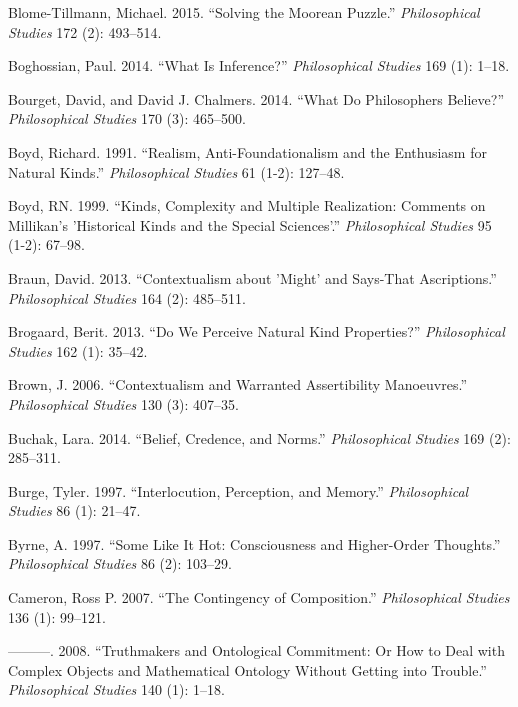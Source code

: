 \documentclass[
  10pt,
  letterpaper,
  DIV=11,
  numbers=noendperiod,
  twoside]{scrartcl}
\newlength{\cslhangindent}
\newenvironment{CSLReferences}[2] %
 {\begin{list}{}{%
  \setlength{\itemindent}{0pt}
  \setlength{\leftmargin}{0pt}
  \setlength{\parsep}{0pt}
  \ifodd #1
   \setlength{\leftmargin}{\cslhangindent}
   \setlength{\itemindent}{-1\cslhangindent}
  \fi
  \setlength{\itemsep}{#2\baselineskip}}}
 {\end{list}}
\begin{document}
\begin{CSLReferences}{1}{0}
Blome-Tillmann, Michael. 2015. {``Solving the Moorean Puzzle.''}
\emph{Philosophical Studies} 172 (2): 493--514.

Boghossian, Paul. 2014. {``What Is Inference?''} \emph{Philosophical
Studies} 169 (1): 1--18.

Bourget, David, and David J. Chalmers. 2014. {``What Do Philosophers
Believe?''} \emph{Philosophical Studies} 170 (3): 465--500.

Boyd, Richard. 1991. {``Realism, Anti-Foundationalism and the Enthusiasm
for Natural Kinds.''} \emph{Philosophical Studies} 61 (1-2): 127--48.

Boyd, RN. 1999. {``Kinds, Complexity and Multiple Realization: Comments
on Millikan's 'Historical Kinds and the Special Sciences'.''}
\emph{Philosophical Studies} 95 (1-2): 67--98.

Braun, David. 2013. {``Contextualism about 'Might' and Says-That
Ascriptions.''} \emph{Philosophical Studies} 164 (2): 485--511.

Brogaard, Berit. 2013. {``Do We Perceive Natural Kind Properties?''}
\emph{Philosophical Studies} 162 (1): 35--42.

Brown, J. 2006. {``Contextualism and Warranted Assertibility
Manoeuvres.''} \emph{Philosophical Studies} 130 (3): 407--35.

Buchak, Lara. 2014. {``Belief, Credence, and Norms.''}
\emph{Philosophical Studies} 169 (2): 285--311.

Burge, Tyler. 1997. {``Interlocution, Perception, and Memory.''}
\emph{Philosophical Studies} 86 (1): 21--47.

Byrne, A. 1997. {``Some Like It Hot: Consciousness and Higher-Order
Thoughts.''} \emph{Philosophical Studies} 86 (2): 103--29.

Cameron, Ross P. 2007. {``The Contingency of Composition.''}
\emph{Philosophical Studies} 136 (1): 99--121.

---------. 2008. {``Truthmakers and Ontological Commitment: Or How to
Deal with Complex Objects and Mathematical Ontology Without Getting into
Trouble.''} \emph{Philosophical Studies} 140 (1): 1--18.


\end{CSLReferences}
\end{document}
